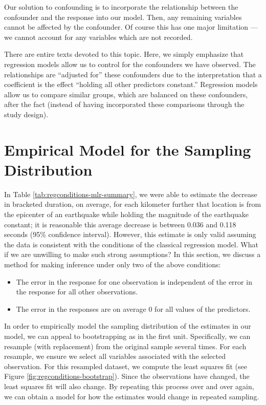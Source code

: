 \documentclass[]{book}
\providecommand{\tightlist}{%
  \setlength{\itemsep}{0pt}\setlength{\parskip}{0pt}}
\theoremstyle{definition}
\theoremstyle{definition}
\theoremstyle{definition}
\theoremstyle{remark}
\begin{document}
Our solution to confounding is to incorporate the relationship between
the confounder and the response into our model. Then, any remaining
variables cannot be affected by the confounder. Of course this has one
major limitation --- we cannot account for any variables which are not
recorded.

There are entire texts devoted to this topic. Here, we simply emphasize
that regression models allow us to control for the confounders we have
observed. The relationships are ``adjusted for'' these confounders due
to the interpretation that a coefficient is the effect ``holding all
other predictors constant.'' Regression models allow us to compare
similar groups, which are balanced on these confounders, after the fact
(instead of having incorporated these comparisons through the study
design).

\section{Empirical Model for the Sampling
Distribution}\label{empirical-model-for-the-sampling-distribution}

In Table \ref{tab:regconditions-mlr-summary}, we were able to estimate
the decrease in bracketed duration, on average, for each kilometer
further that location is from the epicenter of an earthquake while
holding the magnitude of the earthquake constant; it is reasonable this
average decrease is between 0.036 and 0.118 seconds (95\% confidence
interval). However, this estimate is only valid assuming the data is
consistent with the conditions of the classical regression model. What
if we are unwilling to make such strong assumptions? In this section, we
discuss a method for making inference under only two of the above
conditions:

\begin{itemize}
\tightlist
\item
  The error in the response for one observation is independent of the
  error in the response for all other observations.
\item
  The error in the responses are on average 0 for all values of the
  predictors.
\end{itemize}

In order to empirically model the sampling distribution of the estimates
in our model, we can appeal to bootstrapping as in the first unit.
Specifically, we can resample (with replacement) from the original
sample several times. For each resample, we ensure we select all
variables associated with the selected observation. For this resampled
dataset, we compute the least squares fit (see Figure
\ref{fig:regconditions-bootstrap}). Since the observations have changed,
the least squares fit will also change. By repeating this process over
and over again, we can obtain a model for how the estimates would change
in repeated sampling.
\end{document}
